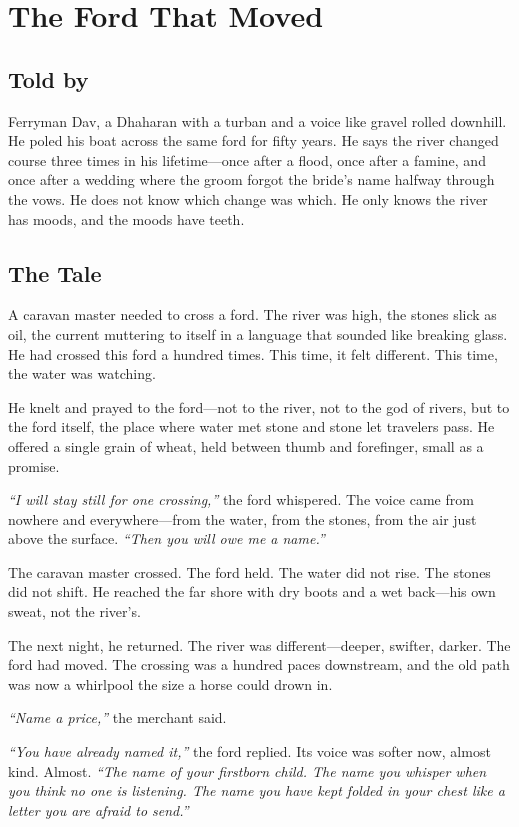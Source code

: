 \chapter{The Ford That Moved}

\section*{Told by}
Ferryman Dav, a Dhaharan with a turban and a voice like gravel rolled downhill. He poled his boat across the same ford for fifty years. He says the river changed course three times in his lifetime---once after a flood, once after a famine, and once after a wedding where the groom forgot the bride's name halfway through the vows. He does not know which change was which. He only knows the river has moods, and the moods have teeth.

\section*{The Tale}

A caravan master needed to cross a ford. The river was high, the stones slick as oil, the current muttering to itself in a language that sounded like breaking glass. He had crossed this ford a hundred times. This time, it felt different. This time, the water was watching.

He knelt and prayed to the ford---not to the river, not to the god of rivers, but to the ford itself, the place where water met stone and stone let travelers pass. He offered a single grain of wheat, held between thumb and forefinger, small as a promise.

\textit{``I will stay still for one crossing,''} the ford whispered. The voice came from nowhere and everywhere---from the water, from the stones, from the air just above the surface. \textit{``Then you will owe me a name.''}

The caravan master crossed. The ford held. The water did not rise. The stones did not shift. He reached the far shore with dry boots and a wet back---his own sweat, not the river's.

The next night, he returned. The river was different---deeper, swifter, darker. The ford had moved. The crossing was a hundred paces downstream, and the old path was now a whirlpool the size a horse could drown in.

\textit{``Name a price,''} the merchant said.

\textit{``You have already named it,''} the ford replied. Its voice was softer now, almost kind. Almost. \textit{``The name of your firstborn child. The name you whisper when you think no one is listening. The name you have kept folded in your chest like a letter you are afraid to send.''}

